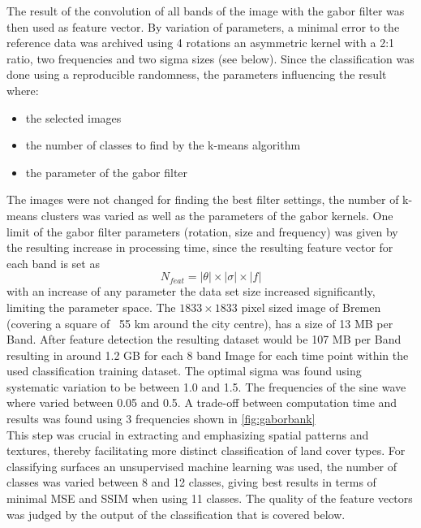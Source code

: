 \documentclass[12pt,a4paper, english,twoside]{scrartcl}
\begin{document}
 \noindent 
      The result of the convolution of all bands of the image with the gabor filter was then used as feature vector. 
      By variation of parameters, a minimal error to the reference data was archived using 4 rotations an asymmetric kernel with a 2:1 ratio, two frequencies and two sigma sizes (see below).
      Since the classification was done using a reproducible randomness, the parameters influencing the result where:
      \begin{itemize}
        \item the selected images
        \item the number of classes to find by the k-means algorithm
        \item the parameter of the gabor filter
      \end{itemize}
      The images were not changed for finding the best filter settings, the number of k-means clusters was varied as well as the parameters of the gabor kernels. 
      One limit of the gabor filter parameters (rotation, size and frequency) was given by the resulting increase in processing time, since the resulting feature vector for each band is set as  
      \begin{equation}
        N_{feat} = |\theta| \times |\sigma| \times |f| 
      \end{equation}
      with an increase of any parameter the data set size increased significantly, limiting the parameter space. 
    The $1833 \times 1833$ pixel sized image of Bremen (covering a square of ~55 km around the city centre), has a size of 13 MB per Band. 
    After feature detection the resulting dataset would be 107 MB per Band resulting in around 1.2 GB for each 8 band Image for each time point within the used classification training dataset.
    The optimal sigma was found using systematic variation to be between 1.0 and 1.5. 
    The frequencies of the sine wave where varied between 0.05 and 0.5. 
    A trade-off between computation time and results was found using 3 frequencies shown in \cref{fig:gaborbank} \\ 
    This step was crucial in extracting and emphasizing spatial patterns and textures, thereby facilitating more distinct classification of land cover types.
      For classifying surfaces an unsupervised machine learning was used, the number of classes was varied between 8 and 12 classes, giving best results in terms of minimal \gls{MSE} and \gls{SSIM} when using 11 classes.
      The quality of the feature vectors was judged by the output of the classification that is covered below. 
\end{document}
